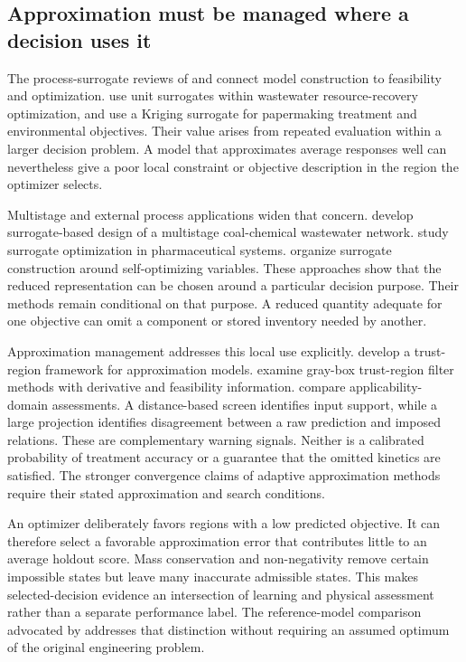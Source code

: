 \subsection{Approximation must be managed where a decision uses it}

The process-surrogate reviews of \citet{BhosekarIerapetritou2018} and \citet{McBride2019} connect model construction to feasibility and optimization. \citet{Durkin2024} use unit surrogates within wastewater resource-recovery optimization, and \citet{He2023} use a Kriging surrogate for papermaking treatment and environmental objectives. Their value arises from repeated evaluation within a larger decision problem. A model that approximates average responses well can nevertheless give a poor local constraint or objective description in the region the optimizer selects.

Multistage and external process applications widen that concern. \citet{Tang2026} develop surrogate-based design of a multistage coal-chemical wastewater network. \citet{Tsochatzidi2025} study surrogate optimization in pharmaceutical systems. \citet{StrausSkogestad2018} organize surrogate construction around self-optimizing variables. These approaches show that the reduced representation can be chosen around a particular decision purpose. Their methods remain conditional on that purpose. A reduced quantity adequate for one objective can omit a component or stored inventory needed by another.

Approximation management addresses this local use explicitly. \citet{Alexandrov1998} develop a trust-region framework for approximation models. \citet{Hameed2026} examine gray-box trust-region filter methods with derivative and feasibility information. \citet{Sahigara2012} compare applicability-domain assessments. A distance-based screen identifies input support, while a large projection identifies disagreement between a raw prediction and imposed relations. These are complementary warning signals. Neither is a calibrated probability of treatment accuracy or a guarantee that the omitted kinetics are satisfied. The stronger convergence claims of adaptive approximation methods require their stated approximation and search conditions.

An optimizer deliberately favors regions with a low predicted objective. It can therefore select a favorable approximation error that contributes little to an average holdout score. Mass conservation and non-negativity remove certain impossible states but leave many inaccurate admissible states. This makes selected-decision evidence an intersection of learning and physical assessment rather than a separate performance label. The reference-model comparison advocated by \citet{Pedrozo2025} addresses that distinction without requiring an assumed optimum of the original engineering problem.

